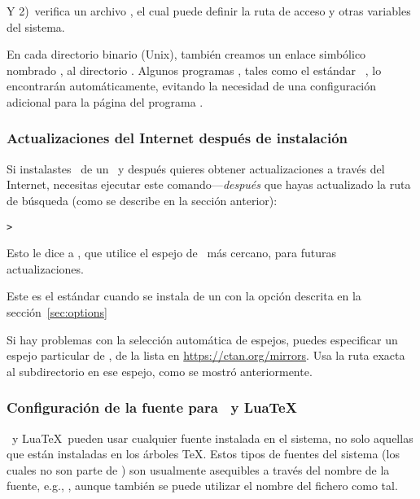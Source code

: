 \documentclass{article}
\begin{document}
Y 2)~verifica un archivo , el cual puede
definir la ruta de acceso y otras variables del sistema.

En cada directorio binario (Unix), también creamos un enlace simbólico
nombrado , al directorio .
Algunos programas , tales como el estándar \macOS\
, lo encontrarán automáticamente, evitando la necesidad de
una configuración adicional para la página del programa
.

\subsubsection{Actualizaciones del Internet después de instalación}
\label{sec:dvd-install-net-updates}

Si instalastes \TL\ de un \DVD\ y después quieres obtener
actualizaciones a través del Internet, necesitas ejecutar este
comando---\emph{después} que hayas actualizado la ruta de
búsqueda (como se describe en la sección anterior):

\begin{alltt}
> 
\end{alltt}

Esto le dice a , que utilice el espejo de \CTAN\ más
cercano, para futuras actualizaciones. 

Este es el estándar cuando se instala de un \DVD con la opción
descrita en la sección~\ref{sec:options}

Si hay problemas con la selección automática de espejos, puedes
especificar un espejo particular de \CTAN, de la lista en
\url{https://ctan.org/mirrors}. Usa la ruta exacta al subdirectorio
\dirname{tlnet} en ese espejo, como se mostró anteriormente.

\subsubsection{Configuración de la fuente para \XeTeX\ y Lua\TeX}
\label{sec:font-conf-sys}

\XeTeX\ y Lua\TeX\ pueden usar cualquier fuente instalada en el
sistema, no solo aquellas que están instaladas en los árboles \TeX.
Estos tipos de fuentes del sistema (los cuales no son parte de \TL) son
usualmente asequibles a través del nombre de la fuente, e.g.,
, aunque también se puede utilizar el nombre del
fichero como tal.
\end{document}
